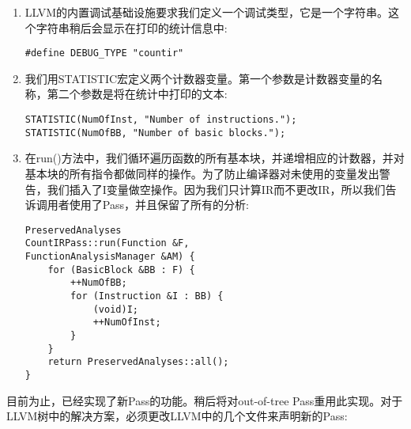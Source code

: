 \begin{enumerate}
\item LLVM的内置调试基础设施要求我们定义一个调试类型，它是一个字符串。这个字符串稍后会显示在打印的统计信息中:
\begin{lstlisting}[caption={}]
#define DEBUG_TYPE "countir"
\end{lstlisting}
	
\item 我们用STATISTIC宏定义两个计数器变量。第一个参数是计数器变量的名称，第二个参数是将在统计中打印的文本:
\begin{lstlisting}[caption={}]
STATISTIC(NumOfInst, "Number of instructions.");
STATISTIC(NumOfBB, "Number of basic blocks.");
\end{lstlisting}
	
\item 在run()方法中，我们循环遍历函数的所有基本块，并递增相应的计数器，并对基本块的所有指令都做同样的操作。为了防止编译器对未使用的变量发出警告，我们插入了I变量做空操作。因为我们只计算IR而不更改IR，所以我们告诉调用者使用了Pass，并且保留了所有的分析:
\begin{lstlisting}[caption={}]
PreservedAnalyses
CountIRPass::run(Function &F,
FunctionAnalysisManager &AM) {
	for (BasicBlock &BB : F) {
		++NumOfBB;
		for (Instruction &I : BB) {
			(void)I;
			++NumOfInst;
		}
	}
	return PreservedAnalyses::all();
}
\end{lstlisting}
	
\end{enumerate}

目前为止，已经实现了新Pass的功能。稍后将对out-of-tree Pass重用此实现。对于LLVM树中的解决方案，必须更改LLVM中的几个文件来声明新的Pass:\par

